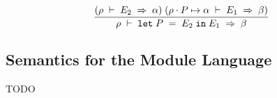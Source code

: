 \documentclass[10pt]{article}
\begin{document}
\begin{equation}
\frac{{\mathrm\mathbf{}(}\rho{}\;\vdash{}\;E_{2}\;\Rightarrow{}\;\alpha{}{\mathrm\mathbf{})}\;{\mathrm\mathbf{}(}\rho{}\cdot{}P\mapsto{}\alpha{}\;\vdash{}\;E_{1}\;\Rightarrow{}\;\beta{}{\mathrm\mathbf{})}}%
{\rho{}\;\vdash{}\;\texttt{let}\;P\;=\;E_{2}\;\texttt{in}\;E_{1}\;\Rightarrow{}\;\beta{}}\end{equation}
\subsection*{Semantics for the Module Language}
TODO
\end{document}
